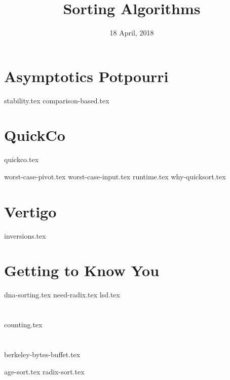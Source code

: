 \documentclass[11pt]{exam}
\title{Sorting Algorithms}
\date{18 April, 2018}
\begin{document}
\maketitle

\section{Asymptotics Potpourri}
{stability.tex}
{comparison-based.tex}

\section{QuickCo}
{quickco.tex}
\begin{questions}
{worst-case-pivot.tex}
{worst-case-input.tex}
{runtime.tex}
{why-quicksort.tex}
\end{questions}

\section{Vertigo}
\begin{questions}
{inversions.tex}
\end{questions}

\clearpage

\section{Getting to Know You}
\begin{questions}
{dna-sorting.tex}
{need-radix.tex}
{lsd.tex}
\end{questions}

\section{}
{counting.tex}

\section{}
{berkeley-bytes-buffet.tex}
\begin{questions}
{age-sort.tex}
{radix-sort.tex}
\end{questions}
\end{document}
